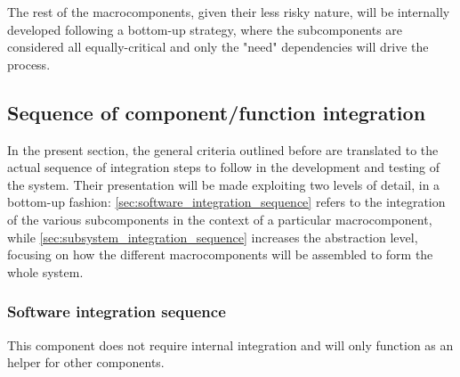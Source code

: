 	The rest of the macrocomponents, given their less risky nature, will be internally developed following a bottom-up strategy, where the subcomponents are considered all equally-critical and only the "need" dependencies will drive the process.

\subsection{Sequence of component/function integration}
	In the present section, the general criteria outlined before are translated to the actual sequence of integration steps to follow in the development and testing of the system. Their presentation will be made exploiting two levels of detail, in a bottom-up fashion: \autoref{sec:software_integration_sequence} refers to the integration of the various subcomponents in the context of a particular macrocomponent, while \autoref{sec:subsystem_integration_sequence} increases the abstraction level, focusing on how the different macrocomponents will be assembled to form the whole system.

	\subsubsection{Software integration sequence}
	\label{sec:software_integration_sequence}
			This component does not require internal integration and will only function as an helper for other components.

